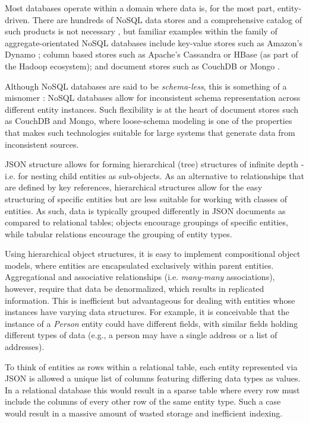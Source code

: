 Most databases operate within a domain where data is, for the most part, entity-driven. There are hundreds of NoSQL data stores and a comprehensive catalog of such products is not necessary \cite{GANESHCHANDRA201513}, but familiar examples within the family of aggregate-orientated NoSQL databases include key-value stores such as Amazon's Dynamo \cite{sadalage2012}; column based stores such as Apache's Cassandra \cite{sadalage2012} or HBase \cite{sadalage2012} (as part of the Hadoop ecosystem); and document stores such as CouchDB or Mongo \cite{sadalage2012}.

Although NoSQL databases are said to be \textit{schema-less}, this is something of a misnomer \cite{ATZENI2016}: NoSQL databases allow for inconsistent schema representation across different entity instances. Such flexibility is at the heart of document stores such as CouchDB and Mongo, where loose-schema modeling is one of the properties that makes such technologies suitable for large systems that generate data from inconsistent sources.

JSON structure allows for forming hierarchical (tree) structures of infinite depth - i.e. for nesting child entities as sub-objects. As an alternative to relationships that are defined by key references, hierarchical structures allow for the easy structuring of specific entities but are less suitable for working with classes of entities. As such, data is typically grouped differently in JSON documents as compared to relational tables; objects encourage groupings of specific entities, while tabular relations encourage the grouping of entity types.

Using hierarchical object structures, it is easy to implement compositional object models, where entities are encapsulated exclusively within parent entities. Aggregational and associative relationships (i.e. \textit{many-many} associations), however, require that data be denormalized, which results in replicated information. This is inefficient but advantageous for dealing with entities whose instances have varying data structures. For example, it is conceivable that the instance of a \textit{Person} entity could have different fields, with similar fields holding different types of data (e.g., a person may have a single address or a list of addresses).

To think of entities as rows within a relational table, each entity represented via JSON is allowed a unique list of columns featuring differing data types as values. In a relational database this would result in a sparse table where every row must include the columns of every other row of the same entity type. Such a case would result in a massive amount of wasted storage and inefficient indexing.

